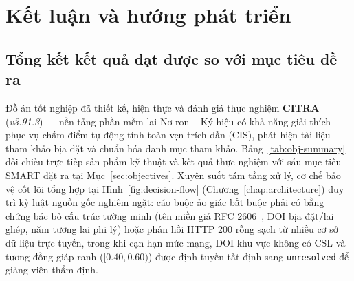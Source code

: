 \chapter{Kết luận và hướng phát triển}
\label{chap:conclusion}

\section{Tổng kết kết quả đạt được so với mục tiêu đề ra}

Đồ án tốt nghiệp đã thiết kế, hiện thực và đánh giá thực nghiệm \textbf{CITRA} (\textit{v3.91.3}) --- nền tảng phần mềm lai Nơ-ron -- Ký hiệu có khả năng giải thích phục vụ chấm điểm tự động tính toàn vẹn trích dẫn (CIS), phát hiện tài liệu tham khảo bịa đặt và chuẩn hóa danh mục tham khảo. Bảng~\ref{tab:obj-summary} đối chiếu trực tiếp sản phẩm kỹ thuật và kết quả thực nghiệm với sáu mục tiêu SMART đặt ra tại Mục~\ref{sec:objectives}. Xuyên suốt tám tầng xử lý, cơ chế bảo vệ cốt lõi tổng hợp tại Hình~\ref{fig:decision-flow} (Chương~\ref{chap:architecture}) duy trì kỷ luật nguồn gốc nghiêm ngặt: cáo buộc ảo giác bắt buộc phải có bằng chứng bác bỏ cấu trúc tường minh (tên miền giả RFC 2606~\cite{rfc2606}, DOI bịa đặt/lai ghép, năm tương lai phi lý) hoặc phản hồi HTTP 200 rỗng sạch từ nhiều cơ sở dữ liệu trực tuyến, trong khi cạn hạn mức mạng, DOI khu vực không có CSL và tương đồng giáp ranh ($[0.40, 0.60)$) được định tuyến tất định sang \texttt{unresolved} để giảng viên thẩm định.

